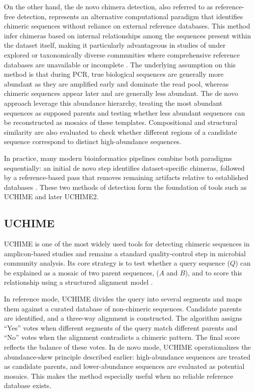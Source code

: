 On the other hand, the de novo chimera detection, also referred to as reference-free detection, represents an alternative computational paradigm that identifies chimeric sequences without reliance on external reference databases. This method infer chimeras based on internal relationships among the sequences present within the dataset itself, making it particularly advantageous in studies of under explored or taxonomically diverse communities where comprehensive reference databases are unavailable or incomplete \citep{Edgar2011,Edgar2016}. The underlying assumption on this method is that during PCR, true biological sequences are generally more abundant as they are amplified early and dominate the read pool, whereas chimeric sequences appear later and are generally less abundant. The de novo approach leverage this abundance hierarchy, treating the most abundant sequences as supposed parents and testing whether less abundant sequences can be reconstructed as mosaics of these templates. Compositional and structural similarity are also evaluated to check whether different regions of a candidate sequence correspond to distinct high-abundance sequences.

In practice, many modern bioinformatics pipelines combine both paradigms sequentially: an initial de novo step identifies dataset-specific chimeras, followed by a reference-based pass that removes remaining artifacts relative to established databases \citep{Edgar2016}. These two methods of detection form the foundation of tools such as UCHIME and later UCHIME2.

\subsection{UCHIME}

UCHIME is one of the most widely used tools for detecting chimeric sequences in amplicon-based studies and remains a standard quality-control step in microbial community analysis. Its core strategy is to test whether a query sequence ($Q$) can be explained as a mosaic of two parent sequences, ($A$ and $B$), and to score this relationship using a structured alignment model \citep{Edgar2011}.

In reference mode, UCHIME divides the query into several segments and maps them against a curated database of non-chimeric sequences. Candidate parents are identified, and a three-way alignment is constructed. The algorithm assigns “Yes” votes when different segments of the query match different parents and “No” votes when the alignment contradicts a chimeric pattern. The final score reflects the balance of these votes. In de novo mode, UCHIME operationalizes the abundance-skew principle described earlier: high-abundance sequences are treated as candidate parents, and lower-abundance sequences are evaluated as potential mosaics. This makes the method especially useful when no reliable reference database exists.

